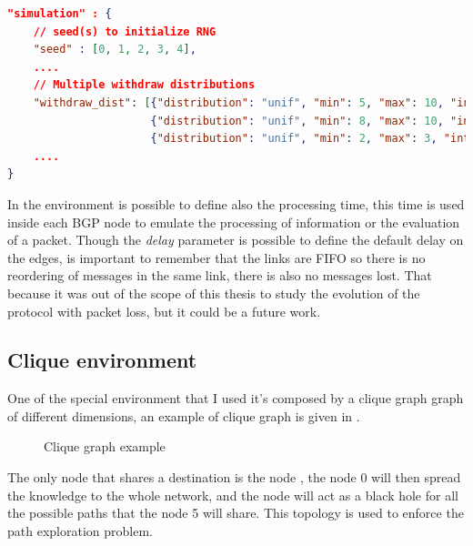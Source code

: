 \begin{lstlisting}[language=json, caption=Environment example, label=lst:environment_example]
"simulation" : {                                                              
    // seed(s) to initialize RNG                                      
    "seed" : [0, 1, 2, 3, 4], 
    ....
    // Multiple withdraw distributions
    "withdraw_dist": [{"distribution": "unif", "min": 5, "max": 10, "int": 0.1},
                      {"distribution": "unif", "min": 8, "max": 10, "int": 0.1},
                      {"distribution": "unif", "min": 2, "max": 3, "int": 0.1}],       
    ....
}
\end{lstlisting}

In the environment is possible to define also the processing time, this time is used
inside each \ac{BGP} node to emulate the processing of information or the evaluation
of a packet.
Though the \textit{delay} parameter is possible to define the default delay on the edges,
is important to remember that the links are FIFO so there is no reordering
of messages in the same link, there is also no messages lost.
That because it was out of the scope of this thesis to study the evolution
of the protocol with packet loss, but it could be a future work.

\subsection{Clique environment}
\label{subsec:clique_env}

One of the special environment that I used it's composed by a clique graph
graph of different dimensions, an example of clique graph is given in
.

\begin{figure}[h]                                                               
    \begin{center}                                                              
        
    \end{center}                                                                
    \caption{Clique graph example}                                
    \label{fig:clique_graph}
\end{figure}

The only node that shares a destination is the node , the node
\num{0} will then spread the knowledge to the whole network, and the node 
 will act as a black hole for all the possible paths
that the node \num{5} will share.
This topology is used to enforce the path exploration problem.


